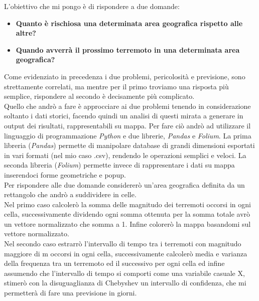 L'obiettivo che mi pongo \`e di rispondere a due domande:
\begin{itemize}
    \item \textbf{Quanto \`e rischiosa una determinata area geografica rispetto alle altre?}
    \item \textbf{Quando avverr\`a il prossimo terremoto in una determinata area geografica?}
\end{itemize}
Come evidenziato in precedenza i due problemi, pericolosit\`a e previsione, sono strettamente correlati, ma mentre per il primo troviamo una risposta pi\`u semplice, rispondere al secondo \`e decisamente pi\`u complicato.\\
Quello che andr\`o a fare \`e approcciare ai due problemi tenendo in considerazione soltanto i dati storici, facendo quindi un analisi di questi mirata a generare in output dei risultati, rappresentabili su mappa. Per fare ci\`o andr\`o ad utilizzare il linguaggio di programmazione \textit{Python} e due librerie, \textit{Pandas} e \textit{Folium}. La prima libreria (\textit{Pandas}) permette di manipolare database di grandi dimensioni esportati in vari formati (nel mio caso .csv), rendendo le operazioni semplici e veloci. La seconda libreria (\textit{Folium}) permette invece di rappresentare i dati su mappa inserendoci forme geometriche e popup.\\
Per rispondere alle due domande considerer\`o un'area geografica definita da un rettangolo che andr\`o a suddividere in celle. \\
Nel primo caso calcoler\`o la somma delle magnitudo dei terremoti occorsi in ogni cella, successivamente dividendo ogni somma ottenuta per la somma totale avr\`o un vettore normalizzato che somma a 1. Infine colorer\`o la mappa basandomi sul vettore normalizzato.\\
Nel secondo caso estrarr\`o l'intervallo di tempo tra i terremoti con magnitudo maggiore di m occorsi in ogni cella, successivamente calcoler\`o media e varianza della frequenza tra un terremoto ed il successivo per ogni cella ed infine assumendo che l'intervallo di tempo si comporti come una variabile casuale X, stimer\`o con la disuguaglianza di Chebyshev un intervallo di confidenza, che mi permetter\`a di fare una previsione in giorni.